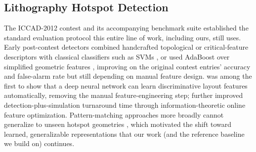 \documentclass[conference]{IEEEtran}
\begin{document}
\subsection{Lithography Hotspot Detection}
The ICCAD-2012 contest and its accompanying benchmark suite
\cite{torres2012iccad} established the standard evaluation protocol
this entire line of work, including ours, still uses. Early
post-contest detectors combined handcrafted topological or
critical-feature descriptors with classical classifiers such as SVMs
\cite{yu2015topological}, or used AdaBoost over simplified geometric
features \cite{matsunawa2015adaboost}, improving on the original
contest entries' accuracy and false-alarm rate but still depending on
manual feature design. \cite{matsunawa2016dnn} was among the first to
show that a deep neural network can learn discriminative layout
features automatically, removing the manual feature-engineering step;
\cite{zhang2016online} further improved detection-plus-simulation
turnaround time through information-theoretic online feature
optimization. Pattern-matching approaches more broadly cannot
generalize to unseen hotspot geometries \cite{yang2017shallow}, which
motivated the shift toward learned, generalizable representations that
our work (and the reference baseline we build on) continues.
\end{document}
